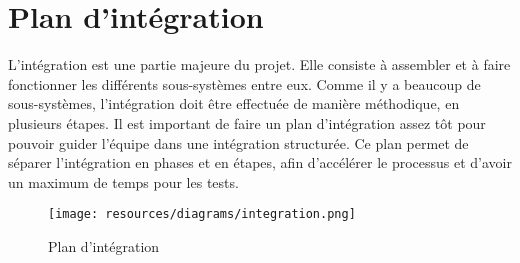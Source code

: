 \chapter{Plan d'intégration}

L'intégration est une partie majeure du projet.
Elle consiste à assembler et à faire fonctionner les différents sous-systèmes entre eux.
Comme il y a beaucoup de sous-systèmes, l'intégration doit être effectuée de manière méthodique, en plusieurs étapes.
Il est important de faire un plan d'intégration assez tôt pour pouvoir guider l'équipe dans une intégration structurée.
Ce plan permet de séparer l'intégration en phases et en étapes, afin d'accélérer le processus et d'avoir un maximum de temps pour les tests.

\begin{landscape}
\begin{figure}
  \centering
  \texttt{[image: resources/diagrams/integration.png]}
  \caption{Plan d'intégration}
\end{figure}
\end{landscape}
